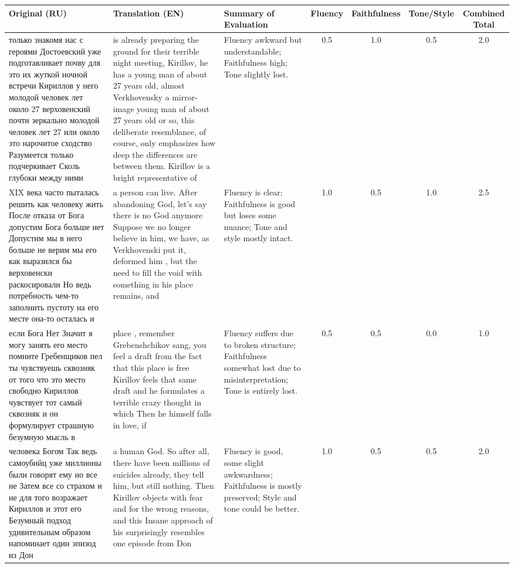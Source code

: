 \documentclass[a4paper,landscape]{article}
\begin{document}
\begin{longtable}{|p{5cm}|p{5cm}|p{5cm}|c|c|c|c|}
\hline
\textbf{Original (RU)} & \textbf{Translation (EN)} & \textbf{Summary of Evaluation} & \textbf{Fluency} & \textbf{Faithfulness} & \textbf{Tone/Style} & \textbf{Combined Total} \\
\hline
\endfirsthead
\hline
\endfoot
только знакомя нас с героями Достоевский уже подготавливает почву для это их жуткой ночной встречи Кириллов у него молодой человек лет около 27 верховенский почти зеркально молодой человек лет 27 или около это нарочитое сходство Разумеется только подчеркивает Сколь глубоки между ними & is already preparing the ground for their terrible night meeting, Kirillov, he has a young man of about 27 years old, almost Verkhovensky a mirror-image young man of about 27 years old or so, this deliberate resemblance, of course, only emphasizes how deep the differences are between them. Kirillov is a bright representative of & Fluency awkward but understandable; Faithfulness high; Tone slightly lost. & 0.5 & 1.0 & 0.5 & 2.0 \\
\hline
XIX века часто пыталась решить как человеку жить После отказа от Бога допустим Бога больше нет Допустим мы в него больше не верим мы его как выразился бы верховенски раскосировали Но ведь потребность чем-то заполнить пустоту на его месте она-то осталась и & a person can live. After abandoning God, let’s say there is no God anymore Suppose we no longer believe in him, we have, as Verkhovenski put it, deformed him , but the need to fill the void with something in his place remains, and & Fluency is clear; Faithfulness is good but loses some nuance; Tone and style mostly intact. & 1.0 & 0.5 & 1.0 & 2.5 \\
\hline
если Бога Нет Значит я могу занять его место помните Гребенщиков пел ты чувствуешь сквозняк от того что это место свободно Кириллов чувствует тот самый сквозняк и он формулирует страшную безумную мысль в & place , remember Grebenshchikov sang, you feel a draft from the fact that this place is free Kirillov feels that same draft and he formulates a terrible crazy thought in which Then he himself falls in love, if & Fluency suffers due to broken structure; Faithfulness somewhat lost due to misinterpretation; Tone is entirely lost. & 0.5 & 0.5 & 0.0 & 1.0 \\
\hline
человека Богом Так ведь самоубийц уже миллионы были говорят ему но все не Затем все со страхом и не для того возражает Кириллов и этот его Безумный подход удивительным образом напоминает один эпизод из Дон & a human God. So after all, there have been millions of suicides already, they tell him, but still nothing. Then Kirillov objects with fear and for the wrong reasons, and this Insane approach of his surprisingly resembles one episode from Don & Fluency is good, some slight awkwardness; Faithfulness is mostly preserved; Style and tone could be better. & 1.0 & 0.5 & 0.5 & 2.0 \\

\end{longtable}
\end{document}

